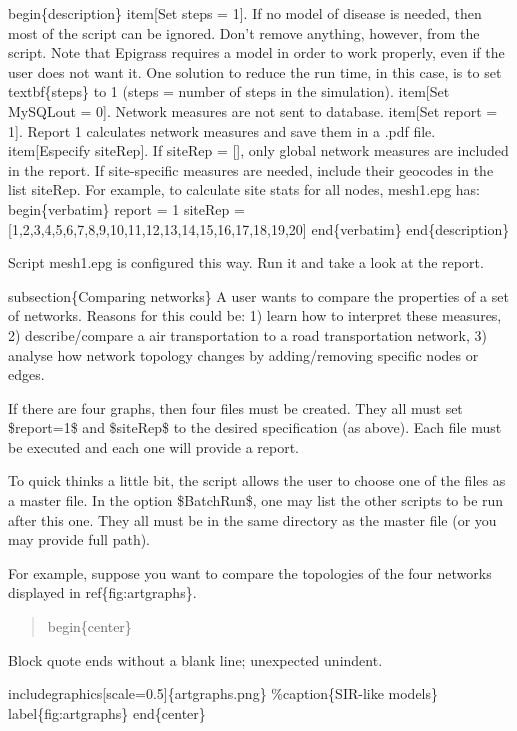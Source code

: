\documentclass[a4paper,10pt]{manual}
\begin{document}
begin\{description\}
item{[}Set steps = 1{]}. If no model of disease is needed, then most of the    script can be ignored. Don't remove anything, however, from the script.  Note that Epigrass requires a model in order to work properly, even if the user does not want it. One solution to reduce the run time, in this case, is to set textbf\{steps\} to 1 (steps = number of steps in the simulation).
item{[}Set MySQLout = 0{]}. Network measures are not sent to database.
item{[}Set report = 1{]}. Report 1 calculates network measures and save them in a .pdf file.
item{[}Especify siteRep{]}. If siteRep = {[}{]}, only global network measures are included in the report. If site-specific measures are needed, include their geocodes in the list siteRep. For example, to calculate site stats for all nodes, mesh1.epg has:
begin\{verbatim\}
report = 1
siteRep = {[}1,2,3,4,5,6,7,8,9,10,11,12,13,14,15,16,17,18,19,20{]}
end\{verbatim\}
end\{description\}

Script mesh1.epg is configured this way. Run it and take a look at the report.

subsection\{Comparing networks\}
A user wants to compare the properties of a set of networks. Reasons for this could be: 1) learn how to interpret these measures, 2) describe/compare a air transportation to a road transportation network, 3) analyse how network topology changes by adding/removing specific nodes or edges.

If there are four graphs, then four    files must be created. They all must set \$report=1\$ and \$siteRep\$ to the desired specification (as above). Each file must be executed and each one will provide a report.

To quick thinks a little bit, the script allows the user to choose one of the files as a master file. In the option \$BatchRun\$, one may list the other scripts to be run after this one. They all must be in the same directory as the master file (or you may provide full path).

For example, suppose you want to compare the topologies of the four networks displayed in ref\{fig:artgraphs\}.
\begin{quote}

begin\{center\}
\end{quote}

Block quote ends without a blank line; unexpected unindent.


includegraphics{[}scale=0.5{]}\{artgraphs.png\}
\%caption\{SIR-like models\}
label\{fig:artgraphs\}
end\{center\}
\end{document}
